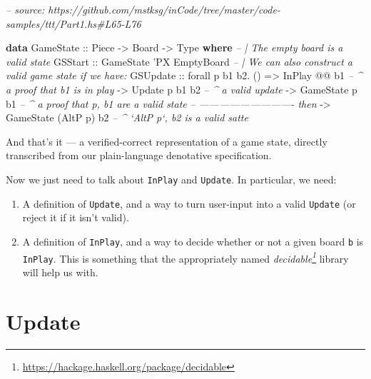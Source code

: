 \documentclass[]{article}
\newenvironment{Shaded}{}{}
\newcommand{\CommentTok}[1]{\textcolor[rgb]{0.38,0.63,0.69}{\textit{#1}}}
\newcommand{\DataTypeTok}[1]{\textcolor[rgb]{0.56,0.13,0.00}{#1}}
\newcommand{\FunctionTok}[1]{\textcolor[rgb]{0.02,0.16,0.49}{#1}}
\newcommand{\KeywordTok}[1]{\textcolor[rgb]{0.00,0.44,0.13}{\textbf{#1}}}
\newcommand{\NormalTok}[1]{#1}
\newcommand{\OtherTok}[1]{\textcolor[rgb]{0.00,0.44,0.13}{#1}}
\renewcommand{\href}[2]{#2\footnote{\url{#1}}}
\begin{document}
\begin{Shaded}
\begin{Highlighting}[]
\CommentTok{-- source: https://github.com/mstksg/inCode/tree/master/code-samples/ttt/Part1.hs#L65-L76}

\KeywordTok{data} \DataTypeTok{GameState}\OtherTok{ ::} \DataTypeTok{Piece} \OtherTok{->} \DataTypeTok{Board} \OtherTok{->} \DataTypeTok{Type} \KeywordTok{where}
    \CommentTok{-- | The empty board is a valid state}
    \DataTypeTok{GSStart}
\OtherTok{        ::} \DataTypeTok{GameState}\NormalTok{ '}\DataTypeTok{PX} \DataTypeTok{EmptyBoard}
    \CommentTok{-- | We can also construct a valid game state if we have:}
    \DataTypeTok{GSUpdate}
\OtherTok{        ::}\NormalTok{ forall p b1 b2}\FunctionTok{.}\NormalTok{ ()}
        \OtherTok{=>} \DataTypeTok{InPlay}          \FunctionTok{@@}\NormalTok{ b1     }\CommentTok{-- ^ a proof that b1 is in play}
        \OtherTok{->} \DataTypeTok{Update}\NormalTok{    p        b1 b2  }\CommentTok{-- ^ a valid update}
        \OtherTok{->} \DataTypeTok{GameState}\NormalTok{ p        b1     }\CommentTok{-- ^ a proof that p, b1 are a valid state}
        \CommentTok{-- ---------------------------- then}
        \OtherTok{->} \DataTypeTok{GameState}\NormalTok{ (}\DataTypeTok{AltP}\NormalTok{ p)    b2  }\CommentTok{-- ^ `AltP p`, b2 is a valid satte}
\end{Highlighting}
\end{Shaded}

And that's it --- a verified-correct representation of a game state, directly
transcribed from our plain-language denotative specification.

Now we just need to talk about \texttt{InPlay} and \texttt{Update}. In
particular, we need:

\begin{enumerate}
\def\labelenumi{\arabic{enumi}.}
\tightlist
\item
  A definition of \texttt{Update}, and a way to turn user-input into a valid
  \texttt{Update} (or reject it if it isn't valid).
\item
  A definition of \texttt{InPlay}, and a way to decide whether or not a given
  board \texttt{b} is \texttt{InPlay}. This is something that the appropriately
  named \emph{\href{https://hackage.haskell.org/package/decidable}{decidable}}
  library will help us with.
\end{enumerate}

\hypertarget{update}{%
\section{Update}\label{update}}
\end{document}
